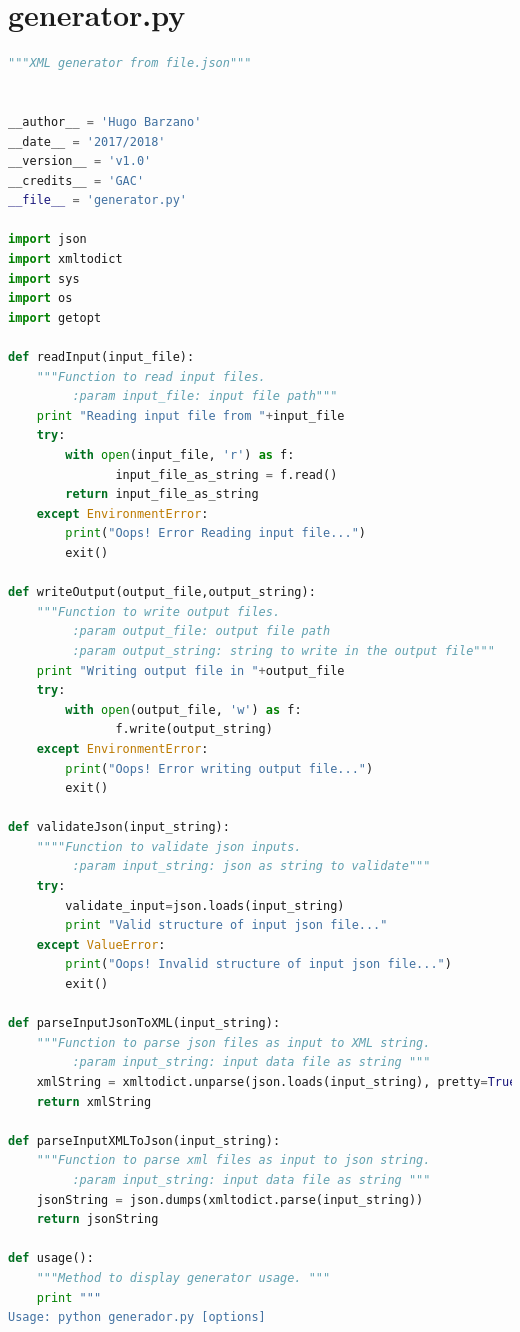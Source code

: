 \documentclass[a4paper,11pt]{book}
\begin{document}
\section{generator.py}
\begin{lstlisting}[language=python,caption={generator.py }]
"""XML generator from file.json"""


__author__ = 'Hugo Barzano'
__date__ = '2017/2018'
__version__ = 'v1.0'
__credits__ = 'GAC'
__file__ = 'generator.py'

import json
import xmltodict
import sys
import os
import getopt

def readInput(input_file):
    """Function to read input files.
         :param input_file: input file path"""
    print "Reading input file from "+input_file
    try:
        with open(input_file, 'r') as f:
    	       input_file_as_string = f.read()
        return input_file_as_string
    except EnvironmentError:
        print("Oops! Error Reading input file...")
        exit()

def writeOutput(output_file,output_string):
    """Function to write output files.
         :param output_file: output file path
         :param output_string: string to write in the output file"""
    print "Writing output file in "+output_file
    try:
        with open(output_file, 'w') as f:
    	       f.write(output_string)
    except EnvironmentError:
        print("Oops! Error writing output file...")
        exit()

def validateJson(input_string):
    """"Function to validate json inputs.
         :param input_string: json as string to validate"""
    try:
        validate_input=json.loads(input_string)
        print "Valid structure of input json file..."
    except ValueError:
        print("Oops! Invalid structure of input json file...")
        exit()

def parseInputJsonToXML(input_string):
    """Function to parse json files as input to XML string.
         :param input_string: input data file as string """
    xmlString = xmltodict.unparse(json.loads(input_string), pretty=True)
    return xmlString

def parseInputXMLToJson(input_string):
    """Function to parse xml files as input to json string.
         :param input_string: input data file as string """
    jsonString = json.dumps(xmltodict.parse(input_string))
    return jsonString

def usage():
    """Method to display generator usage. """
    print """
Usage: python generador.py [options]


\end{lstlisting}
\end{document}
